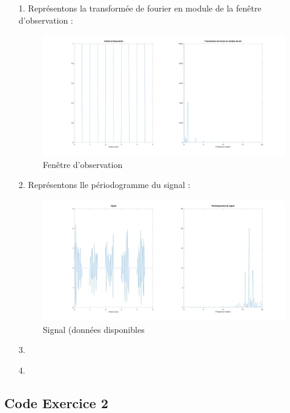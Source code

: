 \documentclass[12pt,a4paper,titlepage]{article}
\begin{document}
\begin{enumerate}

    \item[1.] 
        Représentons la transformée de fourier en module de la fenêtre d'observation :

        \begin{figure}[H]
            \caption{Fenêtre d'observation}
            \includegraphics[width=\textwidth]{win}
            \centering
        \end{figure}

    \item[2.] 
        Représentons lle périodogramme du signal :

        \begin{figure}[H]
            \caption{Signal (données disponibles}
            \includegraphics[width=\textwidth]{periodogramme_sig}
            \centering
        \end{figure}

    \item[3.] 

    \item[4.] 

\end{enumerate}

\begin{appendices}

    \section{Code Exercice 2}



\end{appendices}
\end{document}
